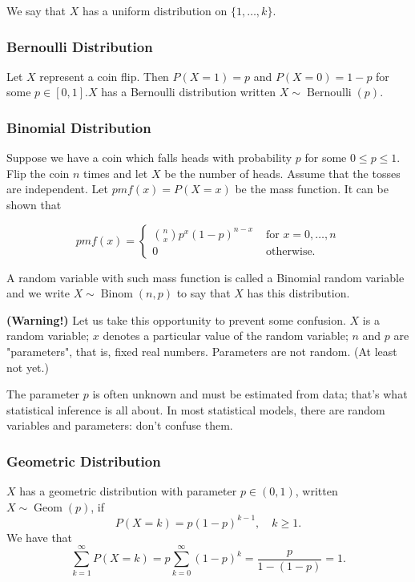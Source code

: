 \documentclass[13pt]{article}
\theoremstyle{definition}
\theoremstyle{remark}
\newenvironment{remark}
  {\pushQED{\qed}\renewcommand{\qedsymbol}{$\triangle$}\remarkx}
  {\popQED\endremarkx}
\begin{document}
We say that $X$ has a uniform distribution on $\{1, \ldots, k\}$.

\subsubsection{Bernoulli Distribution}
Let $X$ represent a coin flip. Then $P(X=1)=p$ and $P(X=0)=1-p$ for some $p \in[0,1] . X$ has a Bernoulli distribution written $X \sim \operatorname{Bernoulli}(p)$.

\subsubsection{Binomial Distribution} Suppose we have a coin which falls heads with probability $p$ for some $0 \leq p \leq 1$. Flip the coin $n$ times and let $X$ be the number of heads. Assume that the tosses are independent. Let $pmf(x)=P(X=x)$ be the mass function. It can be shown that

$$
pmf(x)= \begin{cases}\binom{n}{x} p^{x}(1-p)^{n-x} & \text { for } x=0, \ldots, n \\
0 & \text { otherwise. }\end{cases}
$$

A random variable with such mass function is called a Binomial random variable and we write $X \sim \operatorname{Binom}(n, p)$ to say that $X$ has this distribution.

\begin{remark}\textbf{(Warning!)}
    Let us take this opportunity to prevent some confusion. $X$ is a random variable; $x$ denotes a particular value of the random variable; $n$ and $p$ are "parameters", that is, fixed real numbers. Parameters are not random. (At least not yet.) 
    
    The parameter $p$ is often unknown and must be estimated from data; that's what statistical inference is all about. In most statistical models, there are random variables and parameters: don't confuse them.
\end{remark} 

\subsubsection{Geometric Distribution}$X$ has a geometric distribution with parameter $p \in(0,1)$, written $X \sim \operatorname{Geom}(p)$, if
$$
P(X=k)=p(1-p)^{k-1}, \quad k \geq 1 .
$$
We have that
$$
\sum_{k=1}^{\infty} P(X=k)=p \sum_{k=0}^{\infty}(1-p)^{k}=\frac{p}{1-(1-p)}=1 .
$$
\end{document}
